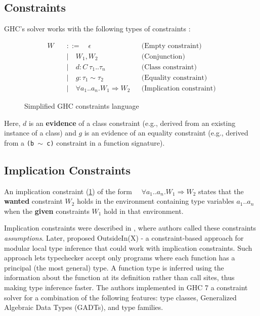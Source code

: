 \subsection{Constraints}

GHC's solver works with the following types of constraints \cite{wits-type-inference-using-constraints}:

\begin{figure}[h]
    \begin{align*}
        W \quad & ::= \quad \epsilon                                 &  & \text{(Empty constraint)}       \\
                & \mid \quad W_1, W_2                                &  & \text{(Conjunction)}            \\
                & \mid \quad d : C~\tau_1 .. \tau_n                  &  & \text{(Class constraint)}       \\
                & \mid \quad g : \tau_1 \sim \tau_2                  &  & \text{(Equality constraint)}    \\
                & \mid \quad \forall a_1 .. a_n. W_1 \Rightarrow W_2 &  & \text{(Implication constraint)}
    \end{align*}
    \caption{Simplified GHC constraints language}
    \label{ghc-constraints}
\end{figure}

Here, $d$ is an \textbf{evidence} of a class constraint (e.g., derived from an existing instance of a class) and $g$ is an evidence of an equality constraint (e.g., derived from a \texttt{(b $\sim$ c)} constraint in a function signature).

\subsection{Implication Constraints}

An implication constraint (\cref{ghc-constraints}) of the form $\quad \forall a_1 .. a_n. W_1 \Rightarrow W_2$ states that the \textbf{wanted} constraint $W_2$ holds in the environment containing type variables $a_1 .. a_n$ when the \textbf{given} constraints $W_1$ hold in that environment.

Implication constraints were described in \cite{essence-of-ml-type-inference}, where authors called these constraints \textit{assumptions}. Later, \citeauthor{vytiniotis-outsideinx-2011} \cite{vytiniotis-outsideinx-2011}
proposed OutsideIn(X) - a constraint-based approach for modular local type inference that could work with implication constraints. Such approach lets typechecker accept only programs where each function has a principal (the most general) type. A function type is inferred using the information about the function at its definition rather than call sites, thus making type inference faster. The authors implemented in GHC 7 a constraint solver for a combination of the following features: type classes, Generalized Algebraic Data Types (GADTs), and type families.

